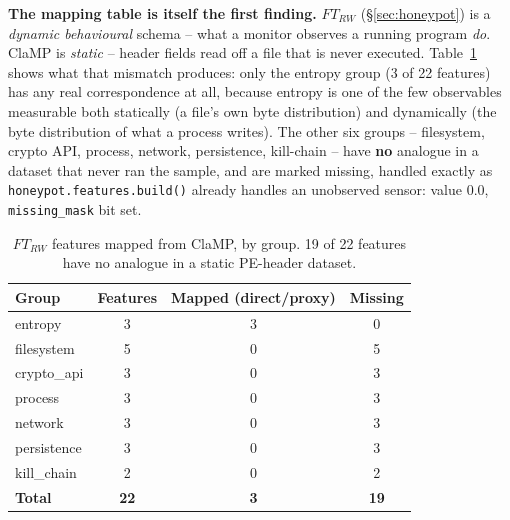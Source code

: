 \documentclass[conference]{IEEEtran}
\begin{document}
\textbf{The mapping table is itself the first finding.} $FT_{RW}$ (\S\ref{sec:honeypot}) is a
\emph{dynamic behavioural} schema -- what a monitor observes a running program \emph{do}. ClaMP is
\emph{static} -- header fields read off a file that is never executed. Table~\ref{tab:m77-mapping}
shows what that mismatch produces: only the entropy group (3 of 22 features) has any real
correspondence at all, because entropy is one of the few observables measurable both statically (a
file's own byte distribution) and dynamically (the byte distribution of what a process writes).
The other six groups -- filesystem, crypto API, process, network, persistence, kill-chain -- have
\textbf{no} analogue in a dataset that never ran the sample, and are marked missing, handled
exactly as \texttt{honeypot.features.build()} already handles an unobserved sensor: value $0.0$,
\texttt{missing\_mask} bit set.

\begin{table}[t]
\centering
\caption{$FT_{RW}$ features mapped from ClaMP, by group. 19 of 22 features have no analogue in a
static PE-header dataset.}
\label{tab:m77-mapping}
\footnotesize
\begin{tabular}{lccc}
\hline
\textbf{Group} & \textbf{Features} & \textbf{Mapped (direct/proxy)} & \textbf{Missing} \\
\hline
entropy & 3 & 3 & 0 \\
filesystem & 5 & 0 & 5 \\
crypto\_api & 3 & 0 & 3 \\
process & 3 & 0 & 3 \\
network & 3 & 0 & 3 \\
persistence & 3 & 0 & 3 \\
kill\_chain & 2 & 0 & 2 \\
\hline
\textbf{Total} & \textbf{22} & \textbf{3} & \textbf{19} \\
\hline
\end{tabular}
\end{table}
\end{document}
